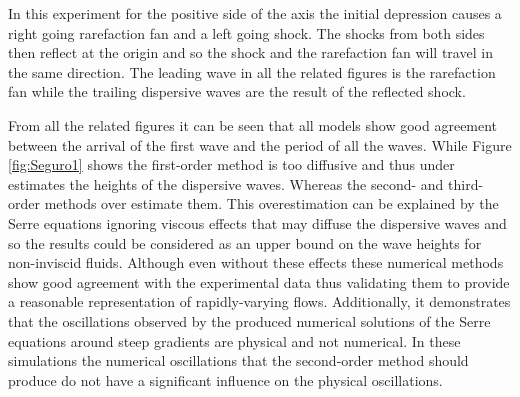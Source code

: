\documentclass[SingleSpace,12pt,Proceedings]{Serre_ASCE}
\begin{document}
In this experiment for the positive side of the axis the initial depression causes a right going rarefaction fan and a left going shock. The shocks from both sides then reflect at the origin and so the shock and the rarefaction fan will travel in the same direction. The leading wave in all the related figures is the rarefaction fan while the trailing dispersive waves are the result of the reflected shock.  

From all the related figures it can be seen that all models show good agreement between the arrival of the first wave and the period of all the waves. While Figure \ref{fig:Seguro1} shows the first-order method is too diffusive and thus under estimates the heights of the dispersive waves. Whereas the second- and third-order methods over estimate them. This overestimation can be explained by the Serre equations ignoring viscous effects that may diffuse the dispersive waves and so the results could be considered as an upper bound on the wave heights for non-inviscid fluids. Although even without these effects these numerical methods show good agreement with the experimental data thus validating them to provide a reasonable representation of rapidly-varying flows. Additionally, it demonstrates that the oscillations observed by the produced numerical solutions of the Serre equations around steep gradients are physical and not numerical. In these simulations the numerical oscillations that the second-order method should produce \cite{Zoppou-Roberts-1996} do not have a significant influence on the physical oscillations.
\end{document}

